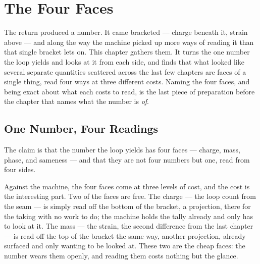 \chapter{The Four Faces}

The return produced a number. It came bracketed --- charge beneath it, strain above --- and along the way the
machine picked up more ways of reading it than that single bracket lets on. This chapter gathers them. It turns
the one number the loop yields and looks at it from each side, and finds that what looked like several separate
quantities scattered across the last few chapters are faces of a single thing, read four ways at three different
costs. Naming the four faces, and being exact about what each costs to read, is the last piece of preparation
before the chapter that names what the number is \emph{of}.

\section{One Number, Four Readings}

The claim is that the number the loop yields has four faces --- charge, mass, phase, and sameness --- and that
they are not four numbers but one, read from four sides.

Against the machine, the four faces come at three levels of cost, and the cost is the interesting part. Two of the
faces are free. The charge --- the loop count from the seam --- is simply read off the bottom of the bracket, a
projection, there for the taking with no work to do; the machine holds the tally already and only has to look at
it. The mass --- the strain, the second difference from the last chapter --- is read off the top of the bracket
the same way, another projection, already surfaced and only wanting to be looked at. These two are the cheap
faces: the number wears them openly, and reading them costs nothing but the glance.


